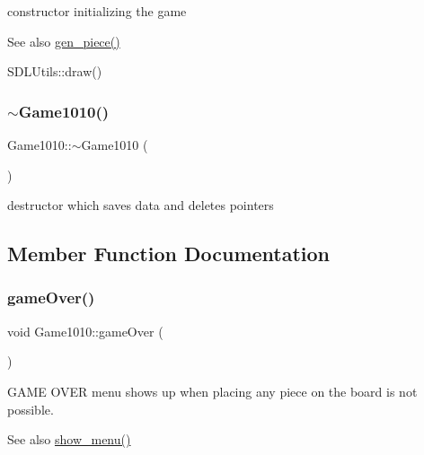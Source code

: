 constructor initializing the game 

\begin{DoxySeeAlso}{See also}
\mbox{\hyperlink{class_game1010_a9576170947a355682c922cb648432b9e}{gen\+\_\+piece()}} 

S\+D\+L\+Utils\+::draw() 
\end{DoxySeeAlso}
\mbox{\label{class_game1010_abcdf29a3fb425ad389e247f241ee4ed5}} 
\subsubsection{\texorpdfstring{$\sim$\+Game1010()}{~Game1010()}}
{\footnotesize\ttfamily Game1010\+::$\sim$\+Game1010 (\begin{DoxyParamCaption}{ }\end{DoxyParamCaption})\hspace{0.3cm}{\ttfamily [inline]}}



destructor which saves data and deletes pointers 



\subsection{Member Function Documentation}
\mbox{\label{class_game1010_a3bc296b7ba6bffeda3baceb1240190b6}} 
\subsubsection{\texorpdfstring{game\+Over()}{gameOver()}}
{\footnotesize\ttfamily void Game1010\+::game\+Over (\begin{DoxyParamCaption}{ }\end{DoxyParamCaption})\hspace{0.3cm}{\ttfamily [inline]}}



G\+A\+ME O\+V\+ER menu shows up when placing any piece on the board is not possible. 

\begin{DoxySeeAlso}{See also}
\mbox{\hyperlink{class_game1010_a99d6f53c3073861fe37ef67caa073840}{show\+\_\+menu()}} 
\end{DoxySeeAlso}
\mbox{\label{class_game1010_ab9c6def8a07ae00b55bd9b51f407eecd}} 
